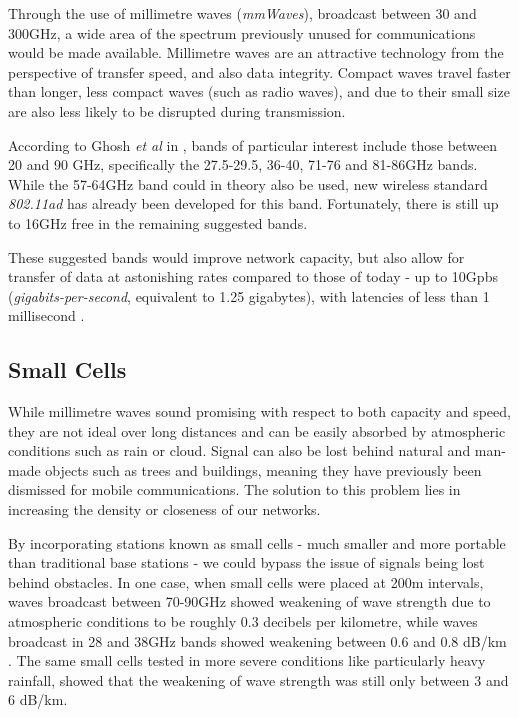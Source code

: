 \documentclass[journal]{IEEEtran}
\begin{document}
Through the use of millimetre waves (\textit{mmWaves}), broadcast between 30 and 300GHz, a wide area of the spectrum previously unused for communications would be made available. Millimetre waves are an attractive technology from the perspective of transfer speed, and also data integrity. Compact waves travel faster than longer, less compact waves (such as radio waves), and due to their small size are also less likely to be disrupted during transmission.

According to Ghosh \textit{et al} in \cite{mmwave}, bands of particular interest include those between 20 and 90 GHz, specifically the 27.5-29.5, 36-40, 71-76 and 81-86GHz bands. While the 57-64GHz band could in theory also be used, new wireless standard \textit{802.11ad} has already been developed for this band. Fortunately, there is still up to 16GHz free in the remaining suggested bands. 

These suggested bands would improve network capacity, but also allow for transfer of data at astonishing rates compared to those of today - up to 10Gpbs (\textit{gigabits-per-second}, equivalent to 1.25 gigabytes), with latencies of less than 1 millisecond \cite{mmwave}. 

\subsection{Small Cells}\label{subsec:smallcells}

While millimetre waves sound promising with respect to both capacity and speed, they are not ideal over long distances and can be easily absorbed by atmospheric conditions such as rain or cloud. Signal can also be lost behind natural and man-made objects such as trees and buildings, meaning they have previously been dismissed for mobile communications. The solution to this problem lies in increasing the density or closeness of our networks. 

By incorporating stations known as small cells - much smaller and more portable than traditional base stations - we could bypass the issue of signals being lost behind obstacles. In one case, when small cells were placed at 200m intervals, waves broadcast between 70-90GHz showed weakening of wave strength due to atmospheric conditions to be roughly 0.3 decibels per kilometre, while waves broadcast in 28 and 38GHz bands showed weakening between 0.6 and 0.8 dB/km \cite{mmwave}. The same small cells tested in more severe conditions like particularly heavy rainfall, showed that the weakening of wave strength was still only between 3 and 6 dB/km. 
\end{document}

